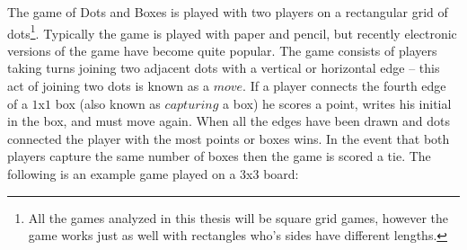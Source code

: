 \documentclass[12pt,twoside]{reedthesis}
\begin{document}
The game of Dots and Boxes is played with two players on a rectangular grid of dots\footnote[1]{All the games analyzed in this thesis will be square grid games, however the game works just as well with rectangles who's sides have different lengths.}.  Typically the game is played with paper and pencil, but recently electronic versions of the game have become quite popular.  The game consists of players taking turns joining two adjacent dots with a vertical or horizontal edge -- this act of joining two dots is known as a $move$.  If a player  connects the fourth edge of a $1$x$1$ box (also known as $capturing$ a box) he scores a point, writes his initial in the box, and must move again.  When all the edges have been drawn and dots connected the player with the most points or boxes wins.  In the event that both players capture the same number of boxes then the game is scored a tie.  The following is an example game played on a $3$x$3$ board:
\end{document}

